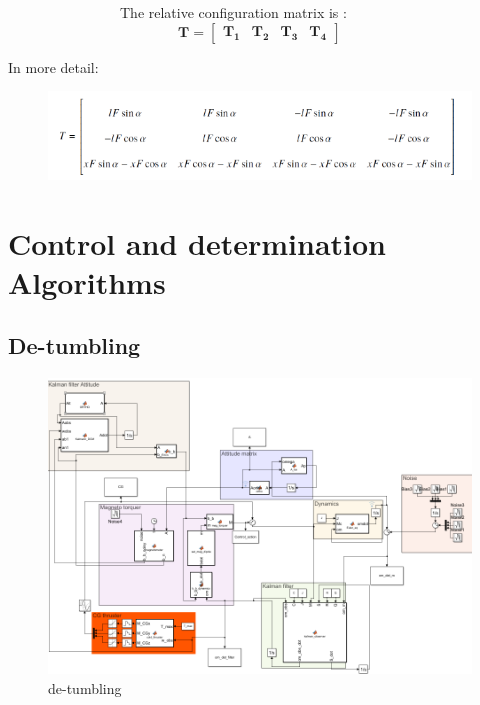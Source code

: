 \documentclass[11pt]{article}
\begin{document}
\begin{minipage}{.5 \textwidth}
\ \ \ \ \ \ \ \ \ \ \ \ \ \  \ \ The relative configuration matrix is :
\begin{equation}
\mathbf{T}=
\begin{bmatrix}
\mathbf{T_1} & \mathbf{T_2} & \mathbf{T_3} & \mathbf{T_4}
\end{bmatrix}
\end{equation}
\end{minipage}
\clearpage
In more detail:
\begin{figure} [H]
\centering 
\includegraphics[scale=0.9]{TT_matr.PNG}
\end{figure}
\section{Control and determination Algorithms}
\subsection{De-tumbling}
\begin{figure} [H]
\centering 
\includegraphics[scale=0.92]{detumbling.PNG}
\caption{ de-tumbling}
\end{figure}
\end{document}
